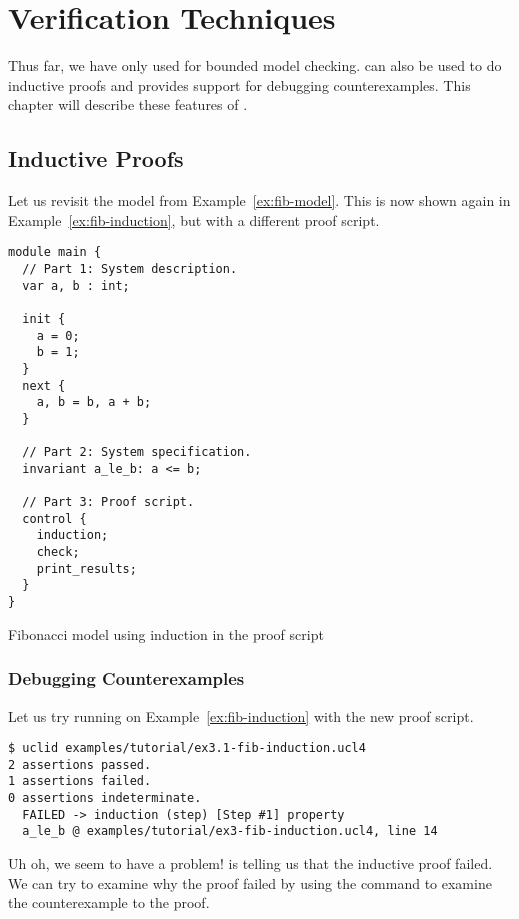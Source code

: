 \chapter{Verification Techniques}

Thus far, we have only used \uclid{} for bounded model checking. \uclid{} can also be used to do inductive proofs and provides support for debugging counterexamples. This chapter will describe these features of \uclid{}.

\section{Inductive Proofs}
Let us revisit the model from Example~\ref{ex:fib-model}. This is now shown again in Example~\ref{ex:fib-induction}, but with a different proof script.

\begin{uclidlisting}[htbp]
\begin{lstlisting}[language=uclid,style=uclidstyle]
module main {
  // Part 1: System description.
  var a, b : int;

  init {
    a = 0;
    b = 1;
  }
  next {
    a, b = b, a + b;
  }

  // Part 2: System specification.
  invariant a_le_b: a <= b;

  // Part 3: Proof script.
  control {
    induction;
    check;
    print_results;
  }
}
\end{lstlisting}
\label{ex:fib-induction}
\caption{\uclid{} Fibonacci model using induction in the proof script}
\end{uclidlisting}

\subsection{Debugging Counterexamples}

Let us try running \uclid{} on Example~\ref{ex:fib-induction} with the new proof script.
\begin{Verbatim}[frame=single, samepage=true]
$ uclid examples/tutorial/ex3.1-fib-induction.ucl4 
2 assertions passed.
1 assertions failed.
0 assertions indeterminate.
  FAILED -> induction (step) [Step #1] property 
  a_le_b @ examples/tutorial/ex3-fib-induction.ucl4, line 14
\end{Verbatim}

Uh oh, we seem to have a problem! \uclid{} is telling us that the inductive proof failed. We can try to examine why the proof failed by using the  command to examine the counterexample to the proof.


